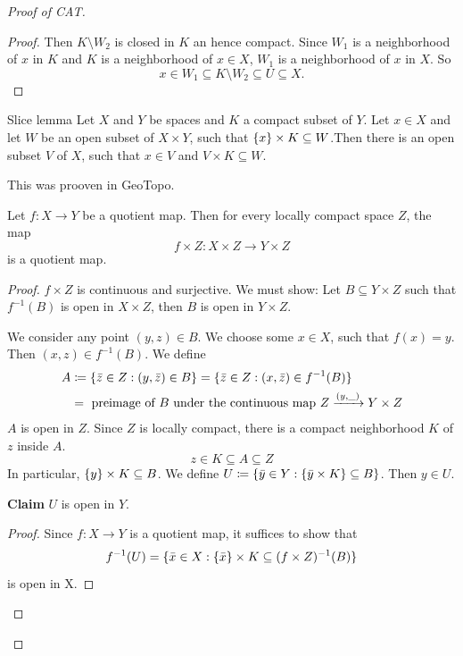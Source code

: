 \documentclass{TemplateLecture}
\begin{document}
\begin{proof}[Proof of CAT]
\begin{proof}
        Then \(K\setminus W_2\) is closed in \(K\) an hence compact. Since \(W_1\) is a neighborhood of \(x\) in \(K\) and \(K\) is a neighborhood of \(x \in X\), \(W_1\) is a neighborhood of \(x\) in \(X\). So
        \[x \in W_1 \subseteq K\setminus W_2 \subseteq U \subseteq X.\]
    \end{proof}
    \begin{lem}{Slice lemma}{}
        Let \(X\) and \(Y\) be spaces and \(K\) a compact subset of \(Y\). Let \(x \in X\) and let \(W\) be an open subset of \(X\times Y\), such that \(\{x\} \times K \subseteq W\).Then there is an open subset \(V\) of \(X\), such that \(x \in V\) and \(V\times K\subseteq W\).
    \end{lem}
    This was prooven in GeoTopo.
    \begin{thm}{}{}
        Let \(f\colon X \to Y\) be a quotient map. Then for every locally compact space \(Z\), the map
        \[f\times Z\colon X\times Z \to Y \times Z\]
        is a quotient map.
    \end{thm}
    \begin{proof}
        \(f\times Z\) is continuous and surjective. We must show: Let \(B\subseteq Y \times Z\) such that \(f^{-1}(B)\) is open in \(X\times Z\), then \(B\) is open in \(Y\times Z\).
        
        We consider any point \((y,z) \in B\). We choose some \(x \in X\), such that \(f(x) = y\). Then \((x,z) \in f^{-1}(B)\).
        We define
        \[\begin{split}
            A &\coloneq \{\bar z \in Z: (y,\bar z) \in B\} = \{\bar z \in Z : (x, \bar z) \in f^{-1}(B)\} \\
            &= \text{ preimage of \(B\) under the continuous map } Z\xrightarrow{(y, \_)} Y \times Z
        \end{split}\]
        \(A\) is open in \(Z\). Since \(Z\) is locally compact, there is a compact neighborhood \(K\) of \(z\) inside \(A\).
        \[z \in K \subseteq A \subseteq Z\]
        In particular, \(\{y\} \times K \subseteq B\).
        We define \(U\coloneq \{\bar y \in Y : \{\bar y \times K\} \subseteq B\}\). Then \(y \in U\).

        \textbf{Claim} \(U\) is open in \(Y\).
        \begin{proof}
            Since \(f\colon X \to Y\) is a quotient map, it suffices to show that
            \[f^{-1}(U) = \{\bar x \in X : \{\bar x\} \times K \subseteq (f\times Z)^{-1}(B)\}\]
            is open in X.


\end{proof}
\end{proof}
\end{proof}
\end{document}
